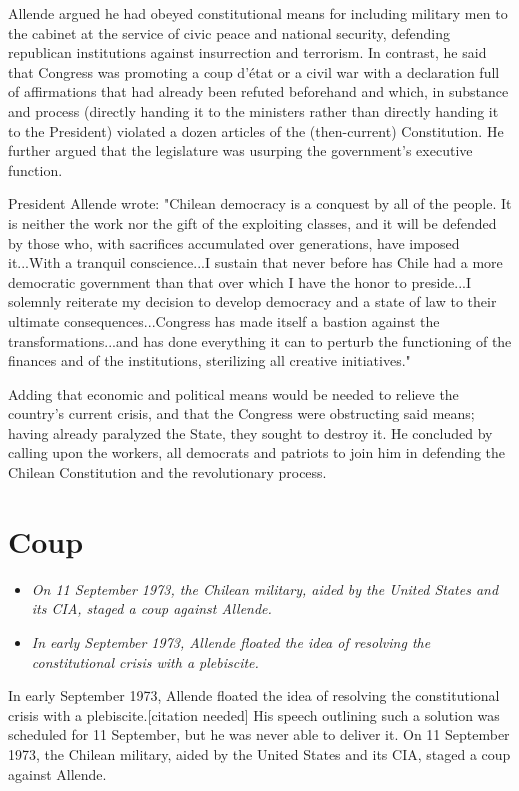 Allende argued he had obeyed constitutional means for including military
men to the cabinet at the service of civic peace and national security,
defending republican institutions against insurrection and terrorism. In
contrast, he said that Congress was promoting a coup d'état or a civil
war with a declaration full of affirmations that had already been
refuted beforehand and which, in substance and process (directly handing
it to the ministers rather than directly handing it to the President)
violated a dozen articles of the (then-current) Constitution. He further
argued that the legislature was usurping the government's executive
function.

President Allende wrote: "Chilean democracy is a conquest by all of the
people. It is neither the work nor the gift of the exploiting classes,
and it will be defended by those who, with sacrifices accumulated over
generations, have imposed it...With a tranquil conscience...I sustain
that never before has Chile had a more democratic government than that
over which I have the honor to preside...I solemnly reiterate my
decision to develop democracy and a state of law to their ultimate
consequences...Congress has made itself a bastion against the
transformations...and has done everything it can to perturb the
functioning of the finances and of the institutions, sterilizing all
creative initiatives."

Adding that economic and political means would be needed to relieve the
country's current crisis, and that the Congress were obstructing said
means; having already paralyzed the State, they sought to destroy it. He
concluded by calling upon the workers, all democrats and patriots to
join him in defending the Chilean Constitution and the revolutionary
process.

\section{Coup}\label{coup}

\begin{itemize}
\item
  \emph{On 11 September 1973, the Chilean military, aided by the United
  States and its CIA, staged a coup against Allende.}
\item
  \emph{In early September 1973, Allende floated the idea of resolving
  the constitutional crisis with a plebiscite.}
\end{itemize}

In early September 1973, Allende floated the idea of resolving the
constitutional crisis with a plebiscite.{[}citation needed{]} His speech
outlining such a solution was scheduled for 11 September, but he was
never able to deliver it. On 11 September 1973, the Chilean military,
aided by the United States and its CIA, staged a coup against Allende.

